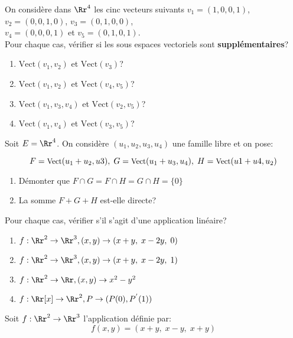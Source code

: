 \documentclass[10pt, a4paper, twocolumn]{homework}
\begin{document}
On considère dans $\Rr^4$ les cinc vecteurs suivants $v_1=(1,0,0,1)$,
$v_2=(0,0,1,0)$, $v_3=(0,1,0,0)$,\\ $v_4=(0,0,0,1)$ et $v_5=(0,1,0,1)$.\\

Pour chaque cas, vérifier si les sous espaces vectoriels sont
\textbf{supplémentaires}?

\begin{enumerate}
  \item $\text{Vect}(v_1,v_2)$ et $\text{Vect}(v_3)$?
  \item $\text{Vect}(v_1,v_2)$ et $\text{Vect}(v_4,v_5)$?
  \item $\text{Vect}(v_1,v_3,v_4)$ et $\text{Vect}(v_2,v_5)$?
  \item $\text{Vect}(v_1,v_4)$ et $\text{Vect}(v_3,v_5)$?
\end{enumerate}
Soit $E=\Rr^4$. On considère $(u_1, u_2, u_3, u_4)$ une famille libre et on
pose:

$$
\small
F=\text{Vect}(u_1 + u_2, u3),\; G=\text{Vect}(u_1+u_3,
u_4),\;H=\text{Vect}(u1+u4, u_2)
$$

\begin{enumerate}
  \item Démonter que $F\cap G = F\cap H = G \cap H = \{0\}$
  \item La somme $F+G+H$ est-elle directe?
\end{enumerate}

Pour chaque cas, vérifier s'il s'agit d'une application linéaire?
\begin{enumerate}
  \item $f:\Rr^2\rightarrow \Rr^3, (x,y)\rightarrow (x+y,\; x-2y,\; 0)$
  \item $f:\Rr^2\rightarrow \Rr^3, (x,y)\rightarrow (x+y,\; x-2y,\; 1)$
  \item $f:\Rr^2\rightarrow \Rr, (x,y)\rightarrow x^2 - y^2$
  \item $f:\Rr[x]\rightarrow \Rr^2, P\rightarrow (P(0), P^{'}(1))$
\end{enumerate}

Soit $f:\Rr^2\rightarrow \Rr^3$ l'application définie par:
\begin{equation*}
  f(x,y)=(x+y,\; x-y,\; x+y)
\end{equation*}
\end{document}
